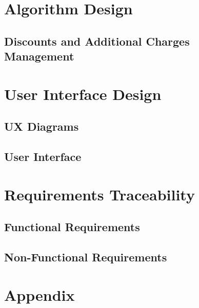 \documentclass[a4paper,12pt]{report}
\begin{document}
\chapter{Algorithm Design}
\label{algorithm_design}

\section{Discounts and Additional Charges Management}


\chapter{User Interface Design}
\label{ui_design}

\section{UX Diagrams}


\section{User Interface}


\chapter{Requirements Traceability}
\label{requirements_traceability}

\section{Functional Requirements}


\section{Non-Functional Requirements}


\appendix
\chapter{Appendix}



\end{document}

